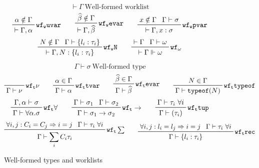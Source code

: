 \documentclass[letterpaper]{article}
\newcommand{\utv}{\alpha}             %
\newcommand{\etv}{\widehat{\beta}}    %
\begin{document}
\begin{figure}
\begin{tabular}{l c l l l}
  \end{tabular}
  $$ \boxed{\vdash\Gamma}\ \textrm{Well-formed worklist} $$
  $$ \prftree[r]{$\mathtt{wf_w uvar}$}
             {\prfassumption{\utv\notin\Gamma}}
             {\vdash\Gamma, \utv}\qquad
     \prftree[r]{$\mathtt{wf_w evar}$}
             {\prfassumption{\etv\notin\Gamma}}
             {\vdash\Gamma, \etv}\qquad
     \prftree[r]{$\mathtt{wf_w pvar}$}
             {\prfassumption{x\notin\Gamma}}{\prfassumption{\Gamma\vdash\sigma}}
             {\vdash\Gamma, x:\sigma} $$
  $$ \prftree[r]{$\mathtt{wf_w N}$}
             {\prfassumption{N\notin\Gamma}}{\prfassumption{\Gamma\vdash\{l_i:\tau_i\}}}
             {\vdash\Gamma, N:\{l_i:\tau_i\}}\qquad
     \prftree[r]{$\mathtt{wf_\omega}$}
             {\prfassumption{\vdash\Gamma}}{\prfassumption{\Gamma\vdash\omega}}
             {\vdash\Gamma\Vdash\omega} $$

  $$ \boxed{\Gamma\vdash\sigma}\ \textrm{Well-formed type}  $$
  $$ \prfbyaxiom{$\mathtt{wf_t \nu}$}{\Gamma\vdash\nu}\qquad
     \prftree[r]{$\mathtt{wf_t tvar}$}
             {\prfassumption{\utv\in\Gamma}}
             {\Gamma\vdash\utv}\qquad
     \prftree[r]{$\mathtt{wf_t evar}$}
             {\prfassumption{\etv\in\Gamma}}
             {\Gamma\vdash\etv}\qquad
     \prftree[r]{$\mathtt{wf_t typeof}$}
             {\prfassumption{N\in\Gamma}}
             {\Gamma\vdash\texttt{typeof}(N)} $$
  $$ \prftree[r]{$\mathtt{wf_t \forall}$}
             {\prfassumption{\Gamma,\utv\vdash\sigma}}
             {\Gamma\vdash\forall\utv.\sigma}\qquad
     \prftree[r]{$\mathtt{wf_t \rightarrow}$}
             {\prfassumption{\Gamma\vdash\sigma_1}}{\prfassumption{\Gamma\vdash\sigma_2}}
             {\Gamma\vdash\sigma_1\rightarrow\sigma_2}\qquad
     \prftree[r]{$\mathtt{wf_t tup}$}
             {\prfassumption{\Gamma\vdash\tau_i\ \forall i}}
             {\Gamma\vdash(\tau_i)} $$
  $$ \prftree[r]{$\mathtt{wf_t \sum}$}
             {\prfassumption{\forall i,j:C_i=C_j\Rightarrow i=j}}
             {\prfassumption{\Gamma\vdash\tau_i\ \forall i}}
             {\Gamma\vdash\sum_i C_i\tau_i}\qquad
     \prftree[r]{$\mathtt{wf_t rec}$}
             {\prfassumption{\forall i,j:l_i=l_j\Rightarrow i=j}}
             {\prfassumption{\Gamma\vdash\tau_i\ \forall i}}
             {\Gamma\vdash\{l_i:\tau_i\}} $$
  \caption{Well-formed types and worklists}
  \label{f:defs:wf:types:worklists}
\end{figure}
\end{document}
